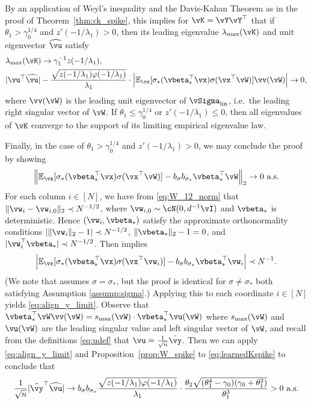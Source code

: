 \begin{proof-of-theorem}[\ref{thm:gd_spike}]
By an application of Weyl's inequality and  the Davis-Kahan Theorem as in the proof of
Theorem~\ref{thm:ck_spike}, this implies for $\vK=\vY\vY^\top$ that if
$\theta_1>\gamma_0^{1/4}$ and $z'(-1/\lambda_1)>0$, then its leading
eigenvalue $\lambda_{\max}(\vK)$ and unit eigenvector $\widehat \vu$ satisfy
\begin{equation}\label{eq:learnedKspike}
	\begin{aligned}
		&\lambda_{\max}(\vK)\to \gamma_1^{-1}z(-1/\lambda_1),\\
		&|\vu^\top \widehat\vu|-
			\frac{\sqrt{z(-1/\lambda_1)\varphi({-}1/\lambda_1)}}{\lambda_1}
			\cdot\left|\E_{\vx}[\sigma_*(\vbeta_*^\top\vx)\sigma(\vx^\top\vW)]\vv(\vW)\right|
			\to 0,
	\end{aligned}
\end{equation}
where $\vv(\vW)$ is the leading unit eigenvector of $\vSigma_{\text{lin}}$,
i.e.\ the leading right singular vector of $\vW$.
If $\theta_1 \leq \gamma_0^{1/4}$ or $z'(-1/\lambda_1) \leq 0$, then all
eigenvalues of $\vK$ converge to the support of its limiting empirical
eigenvalue law.

Finally, in the case of $\theta_1>\gamma_0^{1/4}$ and $z'(-1/\lambda_1)>0$,
we may conclude the proof by showing
\begin{equation}\label{eq:align_y_limit}
	\left\|\E_{\vx}[\sigma_*(\vbeta_*^\top\vx)\sigma(\vx^\top\vW)]
	-b_\sigma b_{\sigma_*} \vbeta_*^\top\vW\right\|_2 \to 0 \text{ a.s.}
\end{equation}
For each column $i\in [N]$, we have from \eqref{eq:W_12_norm} that
$\|\vw_i-\vw_{i,0}\|_2 \prec N^{-1/2}$, where $\vw_{i,0} \sim \cN(0,d^{-1}\vI)$
and $\vbeta_*$ is deterministic. Hence $(\vw_i,\vbeta_*)$ satisfy the approximate
orthonormality conditions $|\|\vw_i\|_2-1| \prec N^{-1/2}$, $\|\vbeta_*\|_2-1=0$,
and $|\vw_i^\top \vbeta_*| \prec N^{-1/2}$. Then
\cite[Lemma D.3(a)]{fan2020spectra} implies
\begin{align*}
	\left|\E_{\vx}[\sigma_*(\vbeta_*^\top\vx)\sigma(\vx^\top\vw_i)]-b_\sigma
b_{\sigma_*} \vbeta_*^\top\vw_i\right|\prec N^{-1}.
\end{align*} 
(We note that \cite[Lemma D.3(a)]{fan2020spectra} assumes $\sigma=\sigma_*$, but the proof is
identical for $\sigma \neq \sigma_*$ both satisfying
Assumption \ref{assump:sigma}.)
Applying this to each coordinate $i \in [N]$ yields \eqref{eq:align_y_limit}.
Observe that $\vbeta_*^\top\vW\vv(\vW)=s_{\max}(\vW) \cdot \vbeta_*^\top\vu(\vW)$
where $s_{\max}(\vW)$ and $\vu(\vW)$ are the leading singular value and left
singular vector of $\vW$, and recall from the definitions \eqref{eq:udef}
that $\vu=\frac{1}{\sqrt{n}}\tilde \vy$.
Then we can apply \eqref{eq:align_y_limit} and
Proposition~\ref{prop:W_spike} to \eqref{eq:learnedKspike} to conclude that 
\[\frac{1}{\sqrt{n}}|\tilde\vy^\top\widehat{\vu}|\to b_\sigma b_{\sigma_*}
\frac{\sqrt{z(-1/\lambda_1)\varphi(-1/\lambda_1)}}{\lambda_1}\cdot
\frac{\theta_2\sqrt{(\theta_1^4-\gamma_0)(\gamma_0+\theta_1^2)}}{\theta_1^3}
>0 \text{ a.s.}\]
\end{proof-of-theorem}

